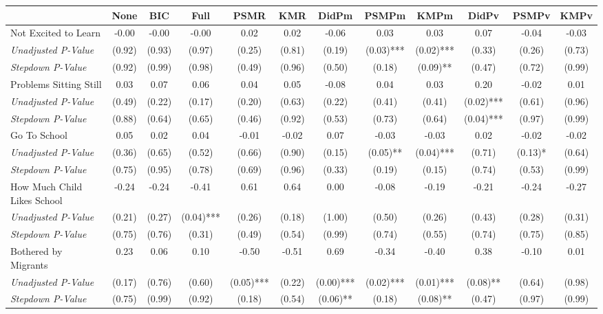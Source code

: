 \begin{tabular}{l c c c c c c c c c c c}
\toprule
 & None & BIC & Full & PSMR & KMR & DidPm & PSMPm & KMPm & DidPv & PSMPv & KMPv \\
\midrule
Not Excited to Learn & -0.00 & -0.00 & -0.00 & 0.02 & 0.02 & -0.06 & 0.03 & 0.03 & 0.07 & -0.04 & -0.03 \\
\quad \textit{Unadjusted P-Value} & (0.92) & (0.93) & (0.97) & (0.25) & (0.81) & (0.19) & (0.03)*** & (0.02)*** & (0.33) & (0.26) & (0.73) \\
\quad \textit{Stepdown P-Value} & (0.92) & (0.99) & (0.98) & (0.49) & (0.96) & (0.50) & (0.18) & (0.09)** & (0.47) & (0.72) & (0.99) \\
Problems Sitting Still & 0.03 & 0.07 & 0.06 & 0.04 & 0.05 & -0.08 & 0.04 & 0.03 & 0.20 & -0.02 & 0.01 \\
\quad \textit{Unadjusted P-Value} & (0.49) & (0.22) & (0.17) & (0.20) & (0.63) & (0.22) & (0.41) & (0.41) & (0.02)*** & (0.61) & (0.96) \\
\quad \textit{Stepdown P-Value} & (0.88) & (0.64) & (0.65) & (0.46) & (0.92) & (0.53) & (0.73) & (0.64) & (0.04)*** & (0.97) & (0.99) \\
Go To School & 0.05 & 0.02 & 0.04 & -0.01 & -0.02 & 0.07 & -0.03 & -0.03 & 0.02 & -0.02 & -0.02 \\
\quad \textit{Unadjusted P-Value} & (0.36) & (0.65) & (0.52) & (0.66) & (0.90) & (0.15) & (0.05)** & (0.04)*** & (0.71) & (0.13)* & (0.64) \\
\quad \textit{Stepdown P-Value} & (0.75) & (0.95) & (0.78) & (0.69) & (0.96) & (0.33) & (0.19) & (0.15) & (0.74) & (0.53) & (0.99) \\
How Much Child Likes School & -0.24 & -0.24 & -0.41 & 0.61 & 0.64 & 0.00 & -0.08 & -0.19 & -0.21 & -0.24 & -0.27 \\
\quad \textit{Unadjusted P-Value} & (0.21) & (0.27) & (0.04)*** & (0.26) & (0.18) & (1.00) & (0.50) & (0.26) & (0.43) & (0.28) & (0.31) \\
\quad \textit{Stepdown P-Value} & (0.75) & (0.76) & (0.31) & (0.49) & (0.54) & (0.99) & (0.74) & (0.55) & (0.74) & (0.75) & (0.85) \\
Bothered by Migrants & 0.23 & 0.06 & 0.10 & -0.50 & -0.51 & 0.69 & -0.34 & -0.40 & 0.38 & -0.10 & 0.01 \\
\quad \textit{Unadjusted P-Value} & (0.17) & (0.76) & (0.60) & (0.05)*** & (0.22) & (0.00)*** & (0.02)*** & (0.01)*** & (0.08)** & (0.64) & (0.98) \\
\quad \textit{Stepdown P-Value} & (0.75) & (0.99) & (0.92) & (0.18) & (0.54) & (0.06)** & (0.18) & (0.08)** & (0.47) & (0.97) & (0.99) \\

\end{tabular}
